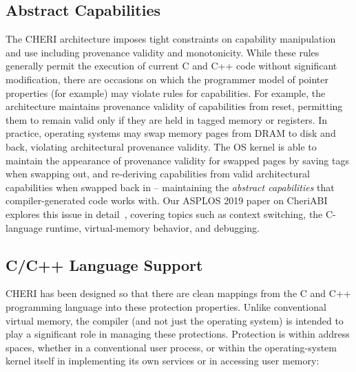 \subsection{Abstract Capabilities}

The CHERI architecture imposes tight constraints on capability manipulation and
use including provenance validity and monotonicity.
While these rules generally permit the execution of current C and C++ code
without significant modification, there are occasions on which the
programmer model of pointer properties (for example) may violate rules for
capabilities.
For example, the architecture maintains provenance validity of capabilities
from reset, permitting them to remain valid only if they are held in tagged
memory or registers.
In practice, operating systems may swap memory pages from DRAM to disk and
back, violating architectural provenance validity.
The OS kernel is able to maintain the appearance of provenance validity for
swapped pages by saving tags when swapping out, and re-deriving capabilities
from valid architectural capabilities when swapped back in -- maintaining the
\textit{abstract capabilities} that compiler-generated code works with.
Our ASPLOS 2019 paper on CheriABI explores this issue in
detail~\cite{davis2019:cheriabi}, covering topics such as context switching,
the C-language runtime, virtual-memory behavior, and debugging.

\subsection{C/C++ Language Support}

CHERI has been designed so that there are clean mappings from the C and C++
programming language into these protection properties.  Unlike
conventional virtual memory, the compiler (and not just the operating system)
is intended to play a significant role in managing these protections.
Protection is within address spaces, whether in a conventional user
process, or within the operating-system kernel itself in implementing its own
services or in accessing user memory:

